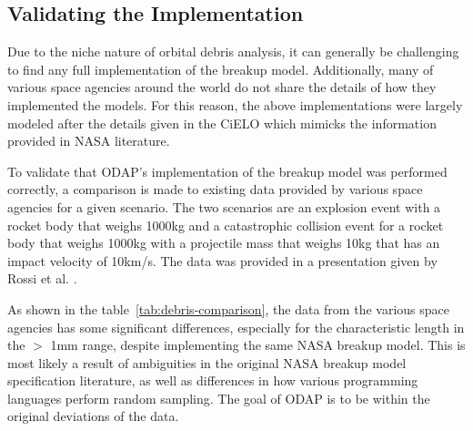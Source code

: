 \documentclass[a4paper, 12pt]{article}
\begin{document}
\subsection{Validating the Implementation}
Due to the niche nature of orbital debris analysis, it can generally be challenging to find any full implementation of the breakup model. Additionally, many of various space agencies around the world do not share the details of how they implemented the models. For this reason, the above implementations were largely modeled after the details given in the CiELO \cite{letizia_space_2016} which mimicks the information provided in NASA literature.

To validate that ODAP's implementation of the breakup model was performed correctly, a comparison is made to existing data provided by various space agencies for a given scenario. The two scenarios are an explosion event with a rocket body that weighs 1000kg and a catastrophic collision event for a rocket body that weighs 1000kg with a projectile mass that weighs 10kg that has an impact velocity of 10km/s. The data was provided in a presentation given by Rossi et al. \citep{rossi_nasa_nodate}.

As shown in the table~\ref{tab:debris-comparison}, the data from the various space agencies has some significant differences, especially for the characteristic length in the $>$ 1mm range, despite implementing the same NASA breakup model. This is most likely a result of ambiguities in the original NASA breakup model specification literature, as well as differences in how various programming languages perform random sampling. The goal of ODAP is to be within the original deviations of the data.
\end{document}
